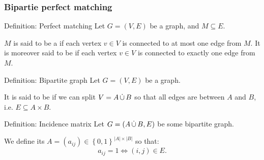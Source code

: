\documentclass[a4paper]{article}
\begin{document}
\subsubsection{Bipartie perfect matching}

\begin{parag}{Definition: Perfect matching}
    Let $G = \left(V, E\right)$ be a graph, and $M \subseteq E$.

    $M$ is said to be a  if each vertex $v \in V$ is connected to at most one edge from $M$. It is moreover said to be  if each vertex $v \in V$ is connected to exactly one edge from $M$.
\end{parag}

\begin{parag}{Definition: Bipartite graph}
    Let $G = \left(V, E\right)$ be a graph.

    It is said to be  if we can split $V = A \operatorname*{\dot{\cup}} B$ so that all edges are between $A$ and $B$, i.e. $E \subseteq A \times B$.
\end{parag}

\begin{parag}{Definition: Incidence matrix}
    Let $G = \left(A \dcup B, E\right)$ be some bipartite graph.

    We define its  $A = \left(a_{ij}\right) \in \left\{0, 1\right\}^{\left|A\right| \times \left|B\right|}$ so that: 
    \[a_{ij} = 1 \iff \left(i, j\right) \in E.\]
\end{parag}
\end{document}
